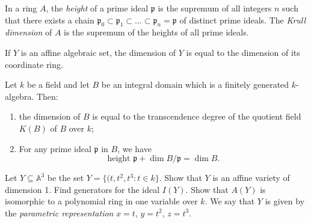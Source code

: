 \begin{definition}
\label{definition-krull-dimension}
In a ring $A$, the {\it height} of a prime ideal $\mathfrak{p}$
is the supremum of all integers $n$
such that there exists a chain 
$\mathfrak{p}_0 \subset\mathfrak{p}_1\subset…\subset\mathfrak{p}_n=\mathfrak{p}$
of distinct prime ideals.
The {\it Krull dimension} of $A$ is the supremum of the heights
of all prime ideals.
\end{definition}

\begin{proposition}
\label{proposition-dimension}
If $Y$ is an affine algebraic set,
the dimension of $Y$ is equal to the dimension
of its coordinate ring.
\end{proposition}

\begin{theorem}
\label{theorem-dimension-and-transcendence-degree}
Let $k$ be a field and let $B$ be an integral domain
which is a finitely generated $k$-algebra. Then:
\begin{enumerate}
\item the dimension of $B$ is equal to the transcendence degree
of the quotient field $K(B)$ of $B$ over $k$;
\item For any prime ideal $\mathfrak{p}$ in $B$, we have
$$
\text{height }\mathfrak{p}+ \dim B / \mathfrak{p}=\dim B.
$$

\end{enumerate}
\end{theorem}

\begin{exercise}
\label{exercise-affine-twisted-cubic}
Let $Y\subseteq \mathbb{A}^3$ be the set
$Y= \{(t,t^2,t^3:t \in k\}$.
Show that $Y$ is an affine variety of dimension 1.
Find generators for the ideal $I(Y)$.
Show that $A(Y)$ is isomorphic to a polynomial ring in one variable over $k$.
We say that $Y$ is given by the {\it parametric representation} 
$x=t$, $y=t^2$, $z=t^3$.
\end{exercise}

